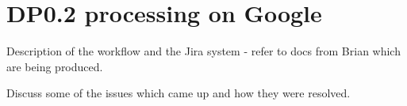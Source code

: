 \section{DP0.2 processing on Google} \label{sec:processing}

Description of the workflow and the Jira system - refer to docs from Brian which are being produced.

Discuss some of the issues which came up and how they were resolved.
